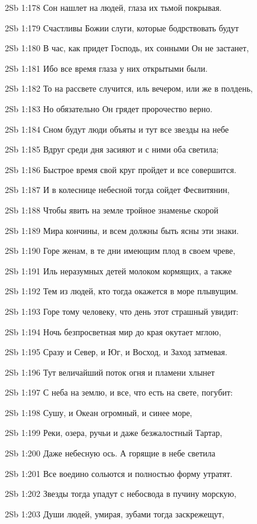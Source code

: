 \vs 2Sb 1:178 Сон нашлет на людей, глаза их тьмой покрывая. 

\vs 2Sb 1:179 Счастливы Божии слуги, которые бодрствовать будут

\vs 2Sb 1:180 В час, как придет Господь, их сонными Он не застанет, 

\vs 2Sb 1:181 Ибо все время глаза у них открытыми были. 

\vs 2Sb 1:182 То на рассвете случится, иль вечером, или же в полдень, 

\vs 2Sb 1:183 Но обязательно Он грядет  пророчество верно. 

\vs 2Sb 1:184 Сном будут люди объяты  и тут все звезды на небе

\vs 2Sb 1:185 Вдруг среди дня засияют и с ними оба светила;

\vs 2Sb 1:186 Быстрое время свой круг пройдет  и все совершится. 

\vs 2Sb 1:187 И в колеснице небесной тогда сойдет Фесвитянин, 

\vs 2Sb 1:188 Чтобы явить на земле тройное знаменье скорой 

\vs 2Sb 1:189 Мира кончины, и всем должны быть ясны эти знаки.

\vs 2Sb 1:190 Горе женам, в те дни имеющим плод в своем чреве,

\vs 2Sb 1:191 Иль неразумных детей молоком кормящих, а также 

\vs 2Sb 1:192 Тем из людей, кто тогда окажется в море плывущим. 

\vs 2Sb 1:193 Горе тому человеку, что день этот страшный увидит: 

\vs 2Sb 1:194 Ночь безпросветная мир до края окутает мглою,

\vs 2Sb 1:195 Сразу и Север, и Юг, и Восход, и Заход затмевая. 

\vs 2Sb 1:196 Тут величайший поток огня и пламени хлынет 

\vs 2Sb 1:197 С неба на землю, и все, что есть на свете, погубит: 

\vs 2Sb 1:198 Сушу, и Океан огромный, и синее море, 

\vs 2Sb 1:199 Реки, озера, ручьи и даже безжалостный Тартар,

\vs 2Sb 1:200 Даже небесную ось. А горящие в небе светила 

\vs 2Sb 1:201 Все воедино сольются и полностью форму утратят. 

\vs 2Sb 1:202 Звезды тогда упадут с небосвода в пучину морскую, 

\vs 2Sb 1:203 Души людей, умирая, зубами тогда заскрежещут, 

